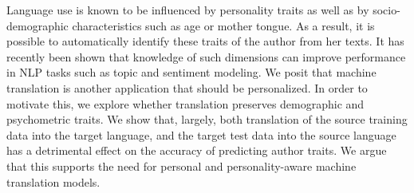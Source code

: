 Language use is known to be influenced by personality traits as well as by socio-demographic characteristics such as age or mother tongue. As a result, it is possible to automatically identify these traits of the author from her texts. It has recently been shown that knowledge of such dimensions can improve performance in NLP tasks such as topic and sentiment modeling. We posit that machine translation is another application that should be personalized. In order to motivate this, we explore whether translation preserves demographic and psychometric traits. We show that, largely, both translation of the source training data into the target language, and the target test data into the source language has a detrimental effect on the accuracy of predicting author traits. We argue that this supports the need for personal and personality-aware machine translation models.
